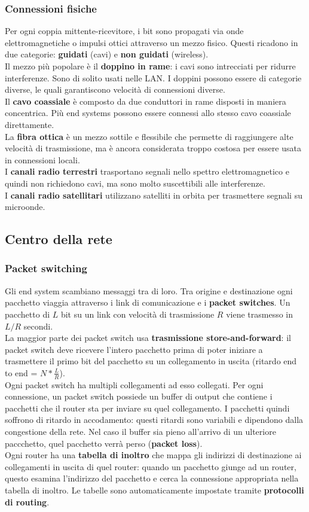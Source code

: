 \documentclass[11pt]{article}
\begin{document}
\subsubsection{Connessioni fisiche}
Per ogni coppia mittente-ricevitore, i bit sono propagati via onde elettromagnetiche o impulsi ottici attraverso un
mezzo fisico. Questi ricadono in due categorie: \textbf{guidati} (cavi) e \textbf{non guidati} (wireless).\\
Il mezzo più popolare è il \textbf{doppino in rame}: i cavi sono intrecciati per ridurre interferenze. Sono di solito 
usati nelle LAN. 
I doppini possono essere di categorie diverse, le quali garantiscono velocità di connessioni diverse.\\
Il \textbf{cavo coassiale} è composto da due conduttori in rame disposti in maniera concentrica. Più end systems possono 
essere connessi allo stesso cavo coassiale direttamente.\\
La \textbf{fibra ottica} è un mezzo sottile e flessibile che permette di raggiungere alte velocità di trasmissione, ma è 
ancora considerata troppo costosa per essere usata in connessioni locali.\\
I \textbf{canali radio terrestri} trasportano segnali nello spettro elettromagnetico e quindi non richiedono cavi, ma 
sono molto suscettibili alle interferenze.\\
I \textbf{canali radio satellitari} utilizzano satelliti in orbita per trasmettere segnali su microonde.
\subsection{Centro della rete}
\subsubsection{Packet switching}
Gli end system scambiano messaggi tra di loro. Tra origine e destinazione ogni pacchetto viaggia attraverso i link di
comunicazione e i \textbf{packet switches}. Un pacchetto di $L$ bit su un link con velocità di trasmissione $R$ viene
trasmesso in $L/R$ secondi.\\
La maggior parte dei packet switch usa \textbf{trasmissione store-and-forward}: il packet switch deve ricevere l'intero 
pacchetto prima di poter iniziare a trasmettere il primo bit del pacchetto su un collegamento in uscita (ritardo end to
end = $N*\frac{L}{R}$).\\
Ogni packet switch ha multipli collegamenti ad esso collegati. Per ogni connessione, un packet switch possiede un buffer
di output che contiene i pacchetti che il router sta per inviare su quel collegamento. I pacchetti quindi soffrono di
ritardo in accodamento: questi ritardi sono variabili e dipendono dalla congestione della rete. Nel caso il buffer sia 
pieno all'arrivo di un ulteriore paccchetto, quel pacchetto verrà perso (\textbf{packet loss}).\\
Ogni router ha una \textbf{tabella di inoltro} che mappa gli indirizzi di destinazione ai collegamenti in uscita di
quel router: quando un pacchetto giunge ad un router, questo esamina l'indirizzo del pacchetto e cerca la connessione 
appropriata nella tabella di inoltro. Le tabelle sono automaticamente impostate tramite \textbf{protocolli di
routing}.
\end{document}

